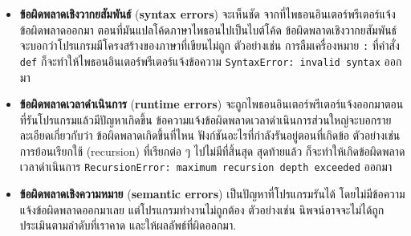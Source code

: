 \begin{itemize}


\item \textbf{ข้อผิดพลาดเชิงวากยสัมพันธ์} (\textbf{syntax errors})
จะเห็นชัด จากที่ไพธอนอินเตอร์พรีเตอร์แจ้งข้อผิดพลาดออกมา
ตอนที่มันแปลโค้ดภาษาไพธอนไปเป็นไบต์โค้ด
ข้อผิดพลาดเชิงวากยสัมพันธ์จะบอกว่าโปรแกรมมีโครงสร้างของภาษาที่เขียนไม่ถูก
ตัวอย่างเช่น การลืมเครื่องหมาย \verb|:| ที่คำสั่ง \texttt{def}
ก็จะทำให้ไพธอนอินเตอร์พรีเตอร์แจ้งข้อความ
\texttt{SyntaxError: invalid syntax} ออกมา



\item \textbf{ข้อผิดพลาดเวลาดำเนินการ} (\textbf{runtime errors}) จะถูกไพธอนอินเตอร์พรีเตอร์แจ้งออกมาตอนที่รันโปรแกรมแล้วมีปัญหาเกิดขึ้น  
ข้อความแจ้งข้อผิดพลาดเวลาดำเนินการส่วนใหญ่จะบอกรายละเอียดเกี่ยวกับว่า ข้อผิดพลาดเกิดขึ้นที่ไหน 
ฟังก์ชันอะไรที่กำลังรันอยู่ตอนที่เกิดข้อ
ตัวอย่างเช่น
การย้อนเรียกใช้ (recursion) ที่เรียกต่อ ๆ ไปไม่มีที่สิ้นสุด 
สุดท้ายแล้ว ก็จะทำให้เกิดข้อผิดพลาดเวลาดำเนินการ 
\texttt{RecursionError: maximum recursion depth exceeded} ออกมา



\item \textbf{ข้อผิดพลาดเชิงความหมาย} (\textbf{semantic errors})
เป็นปัญหาที่โปรแกรมรันได้ โดยไม่มีข้อความแจ้งข้อผิดพลาดออกมาเลย
แต่โปรแกรมทำงานไม่ถูกต้อง
ตัวอย่างเช่น นิพจน์อาจจะไม่ได้ถูกประเมินตามลำดับที่เราคาด และให้ผลลัพธ์ที่ผิดออกมา.


\end{itemize}

